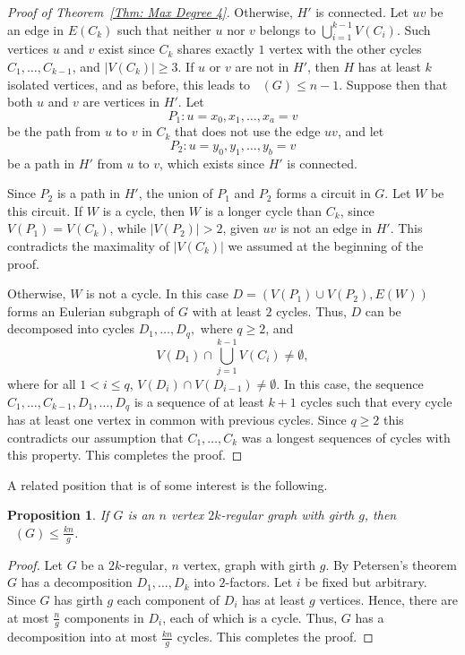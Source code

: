 \documentclass[11pt]{amsart}
\newtheorem{proposition}[theorem]{Proposition}
\theoremstyle{definition}
\DeclareMathOperator{\ce}{f_{ce}}
\begin{document}
\begin{proof}[Proof of Theorem~\ref{Thm: Max Degree 4}]
Otherwise, $H'$ is connected. 
Let $uv$ be an edge in $E(C_k)$ such that neither $u$ nor $v$ belongs to $\bigcup_{i=1}^{k-1} V(C_i)$.
Such vertices $u$ and $v$ exist since $C_k$ shares exactly $1$ vertex with the other cycles $C_1,\dots, C_{k-1}$, and $|V(C_k)|\geq 3$. 
If $u$ or $v$ are not in $H'$, then $H$ has at least $k$ isolated vertices, and as before, this leads to $\ce(G)\leq n-1$.
Suppose then that 
both $u$ and $v$ are vertices in $H'$.
Let
$$P_1: u = x_0, x_1, \ldots, x_a = v$$
be the path from $u$ to $v$ in $C_k$ that does not use the edge $uv$, and let
$$P_2: u = y_0, y_1, \ldots, y_b = v$$
be a path in $H'$ from $u$ to $v$, which exists since $H'$ is connected.


Since $P_2$ is a path in $H'$, the union of $P_1$ and $P_2$ forms a circuit in $G$. 
Let $W$ be this circuit.
If $W$ is a cycle, then 
$W$ is a longer cycle than $C_k$, since $V(P_1) = V(C_k)$, while $|V(P_2)|>2$, given $uv$ is not an edge in $H'$.
This contradicts the maximality of $|V(C_k)|$ we assumed at the beginning of the proof.

Otherwise, $W$ is not a cycle.
In this case $D = (V(P_1)\cup V(P_2),E(W))$ forms an Eulerian subgraph of $G$ with at least $2$ cycles.
Thus, $D$ can be decomposed into cycles $D_1,\dots, D_q,$ where $q\geq 2$, and
\[
V(D_1) \cap \bigcup_{j=1}^{k-1}V(C_i) \neq \emptyset,
\]
where for all $1 < i \leq q$, $V(D_i)\cap V(D_{i-1})\neq \emptyset$.
In this case, the sequence $C_1,\dots, C_{k-1}, D_1,\dots, D_q$ is a sequence of at least $k+1$ cycles such that every cycle has at least one vertex in common with previous cycles.
Since $q\geq 2$ this contradicts our assumption that $C_1,\dots, C_k$ was a longest sequences of cycles with this property.
This completes the proof.
\end{proof}


A related position that is of some interest is the following.


\begin{proposition}\label{Thm: 2k-reg}
    If $G$ is an $n$ vertex $2k$-regular graph with girth $g$, 
    then $\ce(G) \leq \frac{kn}{g}$.
\end{proposition}

\begin{proof}
    Let $G$ be a $2k$-regular, $n$ vertex, graph with girth $g$.
    By Petersen's theorem $G$ has a decomposition $D_1,\dots, D_k$ into $2$-factors.
    Let $i$ be fixed but arbitrary.
    Since $G$ has girth $g$ each component of $D_i$ has at least $g$ vertices.
    Hence, there are at most $\frac{n}{g}$ components in $D_i$, each of which is a cycle.
    Thus, $G$ has a decomposition into at most $\frac{kn}{g}$ cycles.
    This completes the proof.
\end{proof}
\end{document}
